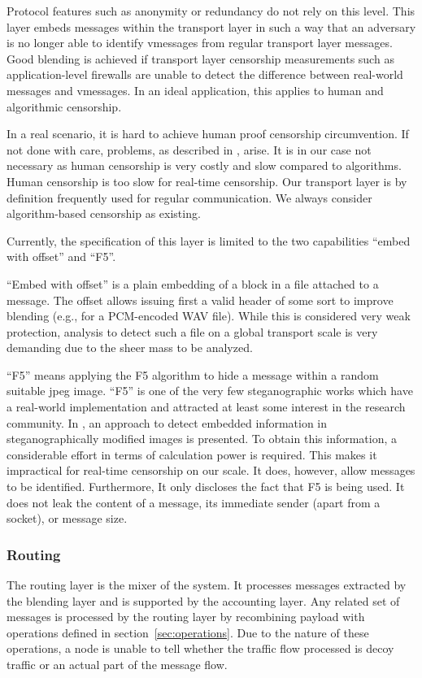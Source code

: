 \documentclass[runningheads]{llncs}
\begin{document}
Protocol features such as anonymity or redundancy do not rely on this level. This layer embeds messages within the transport layer in such a way that an adversary is no longer able to identify vmessages from regular transport layer messages. Good blending is achieved if transport layer censorship measurements such as application-level firewalls are unable to detect the difference between real-world messages and vmessages. In an ideal application, this applies to human  and algorithmic censorship. 

In a real scenario, it is hard to achieve human proof censorship circumvention. If not done with care, problems, as described in \cite{abadi2005moderately}, arise. It is in our case not necessary as human censorship is very costly and slow compared to algorithms. Human censorship is too slow for real-time censorship. Our transport layer is by definition frequently used for regular communication. We always consider algorithm-based censorship as existing.

Currently, the specification of this layer is limited to the two capabilities ``embed with offset'' and ``F5''. 

``Embed with offset'' is a plain embedding of a block in a file attached to a message. The offset allows issuing first a valid header of some sort to improve blending (e.g., for a PCM-encoded WAV file). While this is considered very weak protection, analysis to detect such a file on a global transport scale is very demanding due to the sheer mass to be analyzed. 

``F5'' means applying the F5 algorithm to hide a message within a random suitable jpeg image. ``F5'' is one of the very few steganographic works which have a real-world implementation and attracted at least some interest in the research community. In \cite{steganalysisf5}, an approach to detect embedded information in steganographically modified images is presented. To obtain this information, a considerable effort in terms of calculation power is required. This makes it impractical for real-time censorship on our scale. It does, however, allow messages to be identified. Furthermore, It only discloses the fact that F5 is being used. It does not leak the content of a message, its immediate sender (apart from a socket), or message size.

\subsubsection{Routing}
The routing layer is the mixer of the system. It processes messages extracted by the blending layer and is supported by the accounting layer. Any related set of messages is processed by the routing layer by recombining payload with operations defined in section~\ref{sec:operations}. Due to the nature of these operations, a node is unable to tell whether the traffic flow processed is decoy traffic or an actual part of the message flow.
\end{document}

